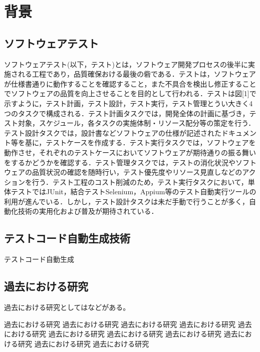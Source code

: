 \documentclass[12pt]{jarticle} %
\begin{document}

\newpage
\section{背景}
\subsection{ソフトウェアテスト}
ソフトウェアテスト(以下，テスト)とは，ソフトウェア開発プロセスの後半に実施される工程であり，品質確保おける最後の砦である．テストは，ソフトウェアが仕様書通りに動作することを確認すること，また不具合を検出し修正することでソフトウェアの品質を向上させることを目的として行われる．テストは図[1]で示すように，テスト計画，テスト設計，テスト実行，テスト管理とうい大きく4つのタスクで構成される．テスト計画タスクでは，開発全体の計画に基づき，テスト対象，スケジュール，各タスクの実施体制・リソース配分等の策定を行う．テスト設計タスクでは，設計書などソフトウェアの仕様が記述されたドキュメント等を基に，テストケースを作成する．テスト実行タスクでは，ソフトウェアを動作させ，それぞれのテストケースにおいてソフトウェアが期待通りの振る舞いをするかどうかを確認する．テスト管理タスクでは，テストの消化状況やソフトウェアの品質状況の確認を随時行い，テスト優先度やリソース見直しなどのアクションを行う．テスト工程のコスト削減のため，テスト実行タスクにおいて，単体テストではJUnit，結合テストSelenium，Appium等のテスト自動実行ツールの利用が進んでいる．しかし，テスト設計タスクは未だ手動で行うことが多く，自動化技術の実用化および普及が期待されている．

\subsection{テストコード自動生成技術}
テストコード自動生成





\subsection{過去における研究}
\label{kako}


過去における研究としては\cite{alex_nips12}などがある。

過去における研究 過去における研究 過去における研究 
過去における研究 過去における研究 過去における研究 過去における研究 
過去における研究 過去における研究 過去における研究 過去における研究 
\end{document}
